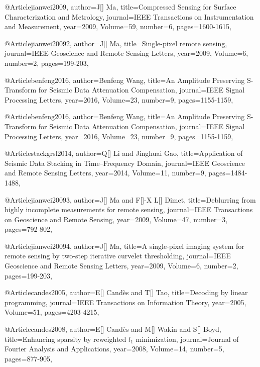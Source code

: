 {@Article{jianwei2009,
  author={J[] Ma},
  title={Compressed Sensing for Surface Characterization and Metrology},
  journal={IEEE Transactions on Instrumentation and Measurement},
  year=2009,
  Volume=59,
  number=6,
  pages={1600-1615},
}

@Article{jianwei20092,
  author={J[] Ma},
  title={Single-pixel remote sensing},
  journal={IEEE Geoscience and Remote Sensing Letters},
  year=2009,
  Volume=6,
  number=2,
  pages={199-203},
}

@Article{benfeng2016,
  author={Benfeng Wang},
  title={An Amplitude Preserving S-Transform for Seismic Data Attenuation Compensation},
  journal={IEEE Signal Processing Letters},
  year=2016,
  Volume=23,
  number=9,
  pages={1155-1159},
}

@Article{benfeng2016,
  author={Benfeng Wang},
  title={An Amplitude Preserving S-Transform for Seismic Data Attenuation Compensation},
  journal={IEEE Signal Processing Letters},
  year=2016,
  Volume=23,
  number=9,
  pages={1155-1159},
}


 @Article{stackgrsl2014,
  author={Q[] Li and Jinghuai Gao},
  title={Application of Seismic Data Stacking in Time–Frequency Domain},
  journal={IEEE Geoscience and Remote Sensing Letters},
  year=2014,
  Volume=11,
  number=9,
  pages={1484-1488},
}





@Article{jianwei20093,
  author={J[] Ma and F[]-X L[] Dimet},
  title={Deblurring from highly incomplete measurements for remote sensing},
  journal={IEEE Transactions on Geoscience and Remote Sensing},
  year=2009,
  Volume=47,
  number=3,
  pages={792-802},
}


@Article{jianwei20094,
  author={J[] Ma},
  title={A single-pixel imaging system for remote sensing by two-step iterative curvelet
thresholding},
  journal={IEEE Geoscience and Remote Sensing Letters},
  year=2009,
  Volume=6,
  number=2,
  pages={199-203},
}

@Article{candes2005,
  author={E[] Cand\`{e}s and T[] Tao},
  title={Decoding by linear programming},
  journal={IEEE Transactions on Information Theory},
  year=2005,
  Volume=51,
  pages={4203-4215},
}

@Article{candes2008,
  author={E[] Cand\`{e}s and M[] Wakin and S[] Boyd},
  title={Enhancing sparsity by reweighted $l_1$ minimization},
  journal={Journal of Fourier Analysis and Applications},
  year=2008,
  Volume=14,
  number=5,
  pages={877-905},
}

}
